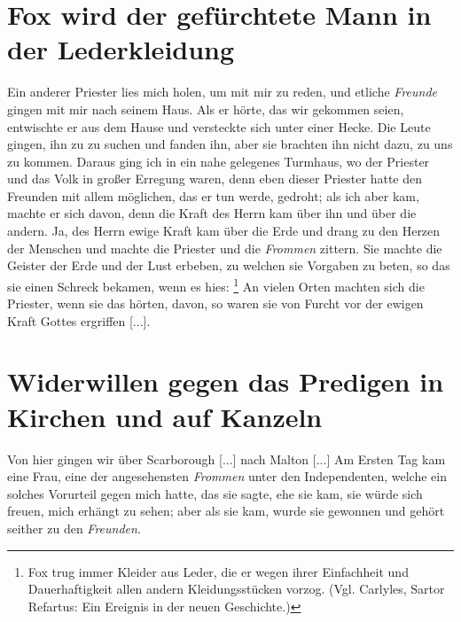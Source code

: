 \section{Fox wird der gefürchtete Mann in der Lederkleidung}

Ein anderer Priester lies mich holen, um mit mir zu reden,
und etliche \textit{Freunde} gingen mit mir nach seinem Haus. Als
er hörte, das wir gekommen seien, entwischte er aus dem Hause
und versteckte sich unter einer Hecke. Die Leute gingen, ihn zu
zu suchen und fanden ihn, aber sie brachten ihn nicht dazu, zu
uns zu kommen. Daraus ging ich in ein nahe gelegenes Turmhaus, 
wo der Priester und das Volk in großer Erregung waren,
denn eben dieser Priester hatte den Freunden mit allem möglichen,
das er tun werde, gedroht; als ich aber kam, machte er sich davon,
denn die Kraft des Herrn kam über ihn und über die andern.
Ja, des Herrn ewige Kraft kam über die Erde und drang zu
den Herzen der Menschen und machte die Priester und die
\textit{Frommen} zittern. Sie machte die 
Geister der Erde und der
Lust erbeben, zu welchen sie Vorgaben zu beten, so das sie einen
Schreck bekamen, wenn es hies: 
\footnote{Fox trug 
immer Kleider aus Leder, die er wegen ihrer Einfachheit und
Dauerhaftigkeit allen andern Kleidungsstücken vorzog. 
(Vgl. Carlyles, Sartor Refartus: Ein Ereignis in der 
neuen Geschichte.)} An vielen Orten machten sich die Priester,
wenn sie das hörten, davon, so waren sie von Furcht vor der
ewigen Kraft Gottes ergriffen [...].

\section{Widerwillen gegen das Predigen in Kirchen und auf Kanzeln}

Von hier gingen wir über Scarborough 
[...] nach Malton [...]
Am Ersten Tag kam eine Frau, eine der angesehensten \textit{Frommen}
unter den Independenten, welche ein 
solches Vorurteil gegen mich
hatte, das sie sagte, ehe sie kam, sie würde sich freuen, mich 
erhängt zu sehen; aber als sie kam, wurde sie gewonnen und 
gehört seither zu den \textit{Freunden}.


